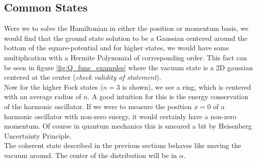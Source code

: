 \subsection{Common States}
Were we to solve the Hamiltonian in either the position or momentum basis, we would find that the ground state solution to be a Gaussian centered around the bottom of the square-potential and for higher states, we would have some multiplication with a Hermite Polynomial of corresponding order. This fact can be seen in figure \ref{fig:Q_func_examples} where the vacuum state is a 2D gaussian centered at the center (\textit{check validity of statement}). \\
Now for the higher Fock states ($n = 3$ is shown), we see a ring, which is centered with an average radius of $n$. A good intuition for this is the energy conservation of the harmonic oscillator. If we were to measure the position $x=0$ of a harmonic oscillator with non-zero energy, it would certainly have a non-zero momentum. Of course in quantum mechanics this is smeared a bit by Heisenberg Uncertainty Principle.\\
The coherent state described in the previous sections behaves like moving the vacuum around. The center of the distribution will be in $\alpha$.  

